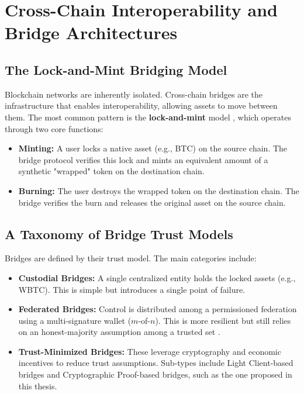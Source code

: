 \documentclass{DESSThesis}
\begin{document}
\section{Cross-Chain Interoperability and Bridge Architectures}
\label{sec:cross_chain_architectures}

\subsection{The Lock-and-Mint Bridging Model}
Blockchain networks are inherently isolated. Cross-chain bridges are the infrastructure that enables interoperability, allowing assets to move between them. The most common pattern is the \textbf{lock-and-mint} model \cite{team_introduction_2024}, which operates through two core functions:
\begin{itemize}
    \item \textbf{Minting:} A user locks a native asset (e.g., BTC) on the source chain. The bridge protocol verifies this lock and mints an equivalent amount of a synthetic "wrapped" token on the destination chain.
    \item \textbf{Burning:} The user destroys the wrapped token on the destination chain. The bridge verifies the burn and releases the original asset on the source chain.
\end{itemize}

\subsection{A Taxonomy of Bridge Trust Models}
Bridges are defined by their trust model. The main categories include:
\begin{itemize}
    \item \textbf{Custodial Bridges:} A single centralized entity holds the locked assets (e.g., WBTC). This is simple but introduces a single point of failure.
    \item \textbf{Federated Bridges:} Control is distributed among a permissioned federation using a multi-signature wallet (\(m\)-of-\(n\)). This is more resilient but still relies on an honest-majority assumption among a trusted set \cite{belenkov_sok_2025}.
    \item \textbf{Trust-Minimized Bridges:} These leverage cryptography and economic incentives to reduce trust assumptions. Sub-types include Light Client-based bridges and Cryptographic Proof-based bridges, such as the one proposed in this thesis.
\end{itemize}
\end{document}
